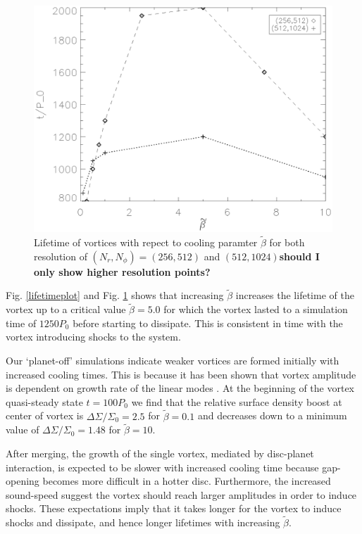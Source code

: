 \begin{figure}
    \includegraphics[width=\linewidth]{figures/betaplot}
 \caption{Lifetime of vortices with repect to cooling paramter $\tilde\beta$ for both resolution of $(N_r,N_\phi)=(256,512)$ and $(512,1024)${\bf should I only show higher resolution points?} } \label{betaplot}
\end{figure}

Fig. \ref{lifetimeplot} and Fig. \ref{betaplot} shows that increasing 
$\tilde{\beta}$
increases the lifetime of the vortex up to a critical 
value $\tilde{\beta}=5.0$ for which the vortex lasted to a simulation time of
 $1250P_0$ before starting to dissipate. This is consistent in time with the
 vortex introducing shocks to the system.

Our `planet-off' simulations
indicate weaker vortices are formed initially with increased cooling
times. This is because it has been shown that vortex amplitude is dependent on 
growth rate of the linear modes \citep{meheut2013}.
At the beginning of the vortex quasi-steady state $t=100P_0$ we find
that the relative surface density boost at center of vortex 
is $\Delta\Sigma/\Sigma_0=2.5$ for $\tilde\beta=0.1$ 
and decreases down to a minimum value of $\Delta\Sigma/\Sigma_0=1.48$ for 
$\tilde\beta=10$. 

 After merging, the growth of the single vortex, mediated by disc-planet
interaction, is expected to be slower with increased cooling time
because gap-opening becomes more difficult in a hotter
disc. Furthermore, the increased sound-speed suggest the vortex should
reach larger amplitudes in order to induce shocks. 
These expectations
imply that it takes longer for the vortex to induce shocks and
dissipate, and hence longer lifetimes with increasing
$\tilde{\beta}$. 

